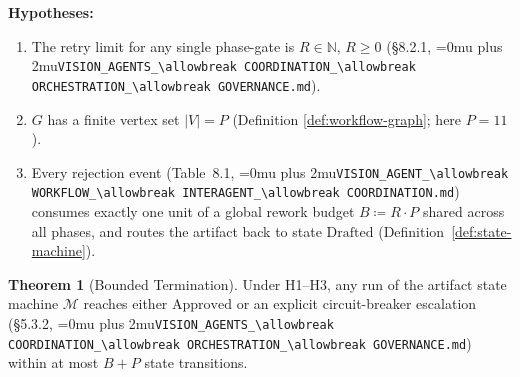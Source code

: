 \documentclass[12pt]{article}
\theoremstyle{definition}
\newtheorem{theorem}{Theorem}
\DeclareRobustCommand{\code}[1]{\begingroup\Urlmuskip=0mu plus 2mu\relax\nolinkurl{#1}\endgroup}
\newcommand{\VisionGov}{\code{VISION\_AGENTS\_\allowbreak COORDINATION\_\allowbreak ORCHESTRATION\_\allowbreak GOVERNANCE.md}}
\newcommand{\VisionFlow}{\code{VISION\_AGENT\_\allowbreak WORKFLOW\_\allowbreak INTERAGENT\_\allowbreak COORDINATION.md}}
\begin{document}
\textbf{Hypotheses:}
\begin{sloppypar}
\begin{enumerate}
    \item[H1] The retry limit for any single phase-gate is $R \in
              \mathbb{N}$, $R \geq 0$ (\S8.2.1,
              \VisionGov{}).
    \item[H2] $G$ has a finite vertex set $|V| = P$ (Definition
              \ref{def:workflow-graph}; here $P = 11$).
    \item[H3] Every rejection event (Table~8.1,
              \VisionFlow{})
              consumes exactly one unit of a global rework budget
              $B \coloneqq R \cdot P$ shared across all phases, and routes
              the artifact back to state $\mathrm{Drafted}$
              (Definition~\ref{def:state-machine}).
\end{enumerate}
\end{sloppypar}

\begin{theorem}[Bounded Termination]
\label{thm:rework}
Under H1--H3, any run of the artifact state machine $\mathcal{M}$ reaches
either $\mathrm{Approved}$ or an explicit circuit-breaker escalation
(\S5.3.2, \VisionGov{})
within at most $B + P$ state transitions.
\end{theorem}
\end{document}
